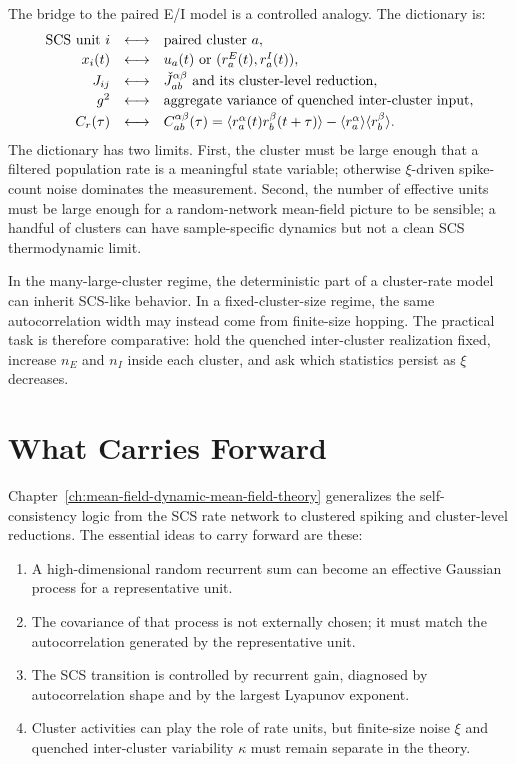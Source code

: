 The bridge to the paired E/I model is a controlled analogy. The dictionary is:
\[
\begin{array}{rcl}
  \hbox{SCS unit } i
  &\longleftrightarrow&
  \hbox{paired cluster } a,\\[2pt]
  x_i(t)
  &\longleftrightarrow&
  u_a(t)\hbox{ or }(r_a^E(t),r_a^I(t)),\\[2pt]
  J_{ij}
  &\longleftrightarrow&
  \check J_{ab}^{\alpha\beta}\hbox{ and its cluster-level reduction},\\[2pt]
  g^2
  &\longleftrightarrow&
  \hbox{aggregate variance of quenched inter-cluster input},\\[2pt]
  C_r(\tau)
  &\longleftrightarrow&
  C_{ab}^{\alpha\beta}(\tau)
  =
  \langle r_a^\alpha(t)r_b^\beta(t+\tau)\rangle
  -
  \langle r_a^\alpha\rangle\langle r_b^\beta\rangle .
\end{array}
\]
The dictionary has two limits. First, the cluster must be large enough that a
filtered population rate is a meaningful state variable; otherwise
\(\xi\)-driven spike-count noise dominates the measurement. Second, the number
of effective units must be large enough for a random-network mean-field picture
to be sensible; a handful of clusters can have sample-specific dynamics but not
a clean SCS thermodynamic limit.

In the many-large-cluster regime, the deterministic part of a cluster-rate
model can inherit SCS-like behavior. In a fixed-cluster-size regime, the same
autocorrelation width may instead come from finite-size hopping. The practical
task is therefore comparative: hold the quenched inter-cluster realization
fixed, increase \(n_E\) and \(n_I\) inside each cluster, and ask which
statistics persist as \(\xi\) decreases.

\section{What Carries Forward}
\label{sec:ch06-carries-forward}

Chapter~\ref{ch:mean-field-dynamic-mean-field-theory} generalizes the
self-consistency logic from the SCS rate network to clustered spiking and
cluster-level reductions. The essential ideas to carry forward are these:

\begin{enumerate}
    \item A high-dimensional random recurrent sum can become an effective
    Gaussian process for a representative unit.
    \item The covariance of that process is not externally chosen; it must match
    the autocorrelation generated by the representative unit.
    \item The SCS transition is controlled by recurrent gain, diagnosed by
    autocorrelation shape and by the largest Lyapunov exponent.
    \item Cluster activities can play the role of rate units, but finite-size
    noise \(\xi\) and quenched inter-cluster variability \(\kappa\) must remain
    separate in the theory.
\end{enumerate}

